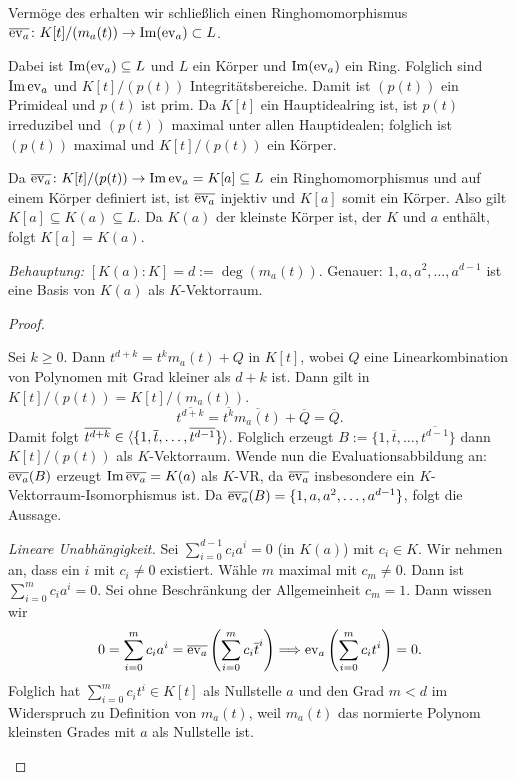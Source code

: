 \documentclass[12pt,a4paper]{scrartcl}
\begin{document}
\begin{description}
	Vermöge des  erhalten wir schließlich einen Ringhomomorphismus $\overline{\operatorname{ev}_a}\colon K[t]/(m_a(t))\to \operatorname{Im}(\operatorname{ev}_a)\subset L$.
	
	
	Dabei ist $\operatorname{Im}(\operatorname{ev}_a)\subseteq L$ und $L$ ein Körper und $\operatorname{Im}(\operatorname{ev}_a)$ ein Ring. Folglich sind $\operatorname{Im}\operatorname{ev}_a$ und $K[t]/(p(t))$ Integritätsbereiche. Damit ist $(p(t))$ ein Primideal und $p(t)$ ist prim. Da $K[t]$ ein Hauptidealring ist, ist $p(t)$ irreduzibel und $(p(t))$ maximal unter allen Hauptidealen; folglich ist $(p(t))$ maximal und $K[t]/(p(t))$ ein Körper.
	
	Da $\overline{\operatorname{ev}_a}\colon K[t]/(p(t))\to \operatorname{Im}\operatorname{ev}_a = K[a]\subseteq L$ ein Ringhomomorphismus und auf einem Körper definiert ist, ist $\overline{\operatorname{ev}_a}$ injektiv und $K[a]$ somit ein Körper. Also gilt $K[a]\subseteq K(a) \subseteq L$. Da $K(a)$ der kleinste Körper ist, der $K$ und $a$ enthält, folgt $K[a] = K(a)$.
	
	\emph{Behauptung:} $[K(a):K] = d := \deg(m_a(t))$. Genauer: $1, a, a^2,\dots, a^{d-1}$ ist eine Basis von $K(a)$ als $K$-Vektorraum.
	\begin{proof}
		\leavevmode
		\begin{description}
			\item[\emph{Erzeugendensystem.}] Sei $k\geq 0$. Dann $t^{d+k} = t^km_a(t)+Q$ in $K[t]$, wobei $Q$ eine Linearkombination von Polynomen mit Grad kleiner als $d+k$ ist. Dann gilt in $K[t]/(p(t)) = K[t]/(m_a(t))$.
			\[\overline{t^{d+k}} = \overline{t^k}\overline{m_a(t)} + \overline{Q} = \overline{Q}.\]
			Damit folgt $\overline{t^{d+k}} \in \langle \{1, \overline{t}, \dots, \overline{t^{d-1}}\}\rangle$. Folglich erzeugt $B :=  \{1, \overline{t}, \dots, \overline{t^{d-1}}\}$ dann $K[t]/(p(t))$ als $K$-Vektorraum. Wende nun die Evaluationsabbildung an:
			$\overline{\operatorname{ev}_a}(B)$ erzeugt $\operatorname{Im}\overline{\operatorname{ev}_a} = K(a)$ als $K$-VR, da $\overline{\operatorname{ev}_a}$ insbesondere ein $K$-Vektorraum-Isomorphismus ist. Da $\overline{\operatorname{ev}_a}(B) = \{1, a, a^2,\dots, a^{d-1}\}$, folgt die Aussage.
			\item{\emph{Lineare Unabhängigkeit.}} Sei $\sum_{i =0}^{d-1}c_ia^i = 0$ (in $K(a)$) mit $c_i\in K$. Wir nehmen an, dass ein $i$ mit $c_i\neq 0$ existiert. Wähle $m$ maximal mit $c_m \neq 0$. Dann ist $\sum_{i = 0}^{m}c_ia^i = 0$. Sei ohne Beschränkung der Allgemeinheit $c_m = 1$. Dann wissen wir
			\[0 = \sum_{i = 0}^m c_ia^i = \overline{\operatorname{ev}_a}\left(\sum_{i=0}^mc_i\overline{t}^i\right)\Longrightarrow \operatorname{ev}_a\left(\sum_{i=0}^m c_it^i\right) = 0.\]
			Folglich hat $\sum_{i=0}^mc_it^i\in K[t]$ als Nullstelle $a$ und den Grad $m <d$ im Widerspruch zu Definition von $m_a(t)$, weil $m_a(t)$ das normierte Polynom kleinsten Grades mit $a$ als Nullstelle ist.
    \qedhere
		\end{description}
	\end{proof}
\end{description}
\end{document}

